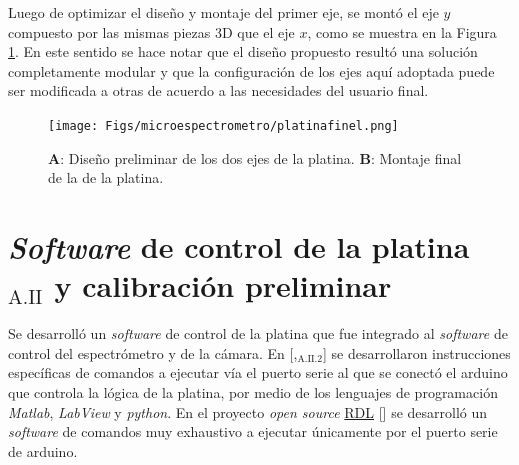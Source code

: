 Luego de optimizar el diseño y montaje del primer eje, se montó el eje $\textit{y}$ compuesto por las mismas piezas 3D que el eje $\textit{x}$, como se muestra en la Figura \ref{fig:eee}. En este sentido se hace notar que el diseño propuesto resultó una solución completamente modular y que la configuración de los ejes aquí adoptada puede ser modificada a otras de acuerdo a las necesidades del usuario final. 
 
\begin{figure}[H]
\centering
\texttt{[image: Figs/microespectrometro/platinafinel.png]}	
\caption{\textbf{A}: Diseño preliminar de los dos ejes de la platina. \textbf{B}: Montaje final de la de la platina.}
\label{fig:eee}
\end{figure}


\singlespacing
\section*{\textit{Software} de control de la platina \href{https://github.com/jrr1984/open\_frame\_XYStage}{\faGithub}$_{\text{A.II}}$  y calibración preliminar}
\label{sec:softcalib}

\hspace{0.5cm}Se desarrolló un \textit{software} de control de la platina que fue integrado al \textit{software} de control del espectrómetro y de la cámara. En [\cite{campbells},\href{https://github.com/raacampbell/openstage/tree/master/serialInterfaceScripts}{\faGithub$_{\text{A.II}.2}$}] se desarrollaron instrucciones específicas de comandos a ejecutar vía el puerto serie al que se conectó el arduino que controla la lógica de la platina, por medio de los lenguajes de programación \textit{Matlab}, \textit{LabView} y \textit{python}. En el proyecto \textit{open source} \href{https://www.youtube.com/watch?v=Lm8oprDhAnQ}{RDL} [\href{https://forum.arduino.cc/index.php?topic=469343}{\faCode}] se desarrolló un \textit{software} de comandos muy exhaustivo a ejecutar únicamente por el puerto serie de arduino.

